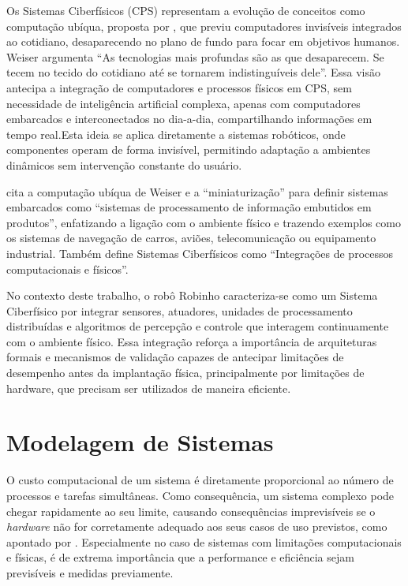 Os Sistemas Ciberfísicos (CPS) representam a evolução de conceitos como computação ubíqua, proposta por \cite{weiser1991}, que previu computadores invisíveis integrados ao cotidiano, desaparecendo no plano de fundo para focar em objetivos humanos. Weiser argumenta \enquote{As tecnologias mais profundas são as que desaparecem. Se tecem no tecido do cotidiano até se tornarem indistinguíveis dele}. Essa visão antecipa a integração de computadores e processos físicos em CPS, sem necessidade de inteligência artificial complexa, apenas com computadores embarcados e interconectados no dia-a-dia, compartilhando informações em tempo real.Esta ideia se aplica diretamente a sistemas robóticos, onde componentes operam de forma invisível, permitindo adaptação a ambientes dinâmicos sem intervenção constante do usuário.

\cite{Marwedel2021} cita a computação ubíqua de Weiser e a \enquote{miniaturização} para definir sistemas embarcados como \enquote{sistemas de processamento de informação embutidos em produtos}, enfatizando a ligação com o ambiente físico e trazendo exemplos como os sistemas de navegação de carros, aviões, telecomunicação ou equipamento industrial. Também define Sistemas Ciberfísicos como \enquote{Integrações de processos computacionais e físicos}.

No contexto deste trabalho, o robô Robinho caracteriza-se como um Sistema Ciberfísico por integrar sensores, atuadores, unidades de processamento distribuídas e algoritmos de percepção e controle que interagem continuamente com o ambiente físico. Essa integração reforça a importância de arquiteturas formais e mecanismos de validação capazes de antecipar limitações de desempenho antes da implantação física, principalmente por limitações de hardware, que precisam ser utilizados de maneira eficiente.

\section{Modelagem de Sistemas}

O custo computacional de um sistema é diretamente proporcional ao número de processos e tarefas simultâneas. Como consequência, um sistema complexo pode chegar rapidamente ao seu limite, causando consequências imprevisíveis se o \textit{hardware} não for corretamente adequado aos seus casos de uso previstos, como apontado por \cite{SennBourdon2022}. Especialmente no caso de sistemas com limitações computacionais e físicas, é de extrema importância que a performance e eficiência sejam previsíveis e medidas previamente.

